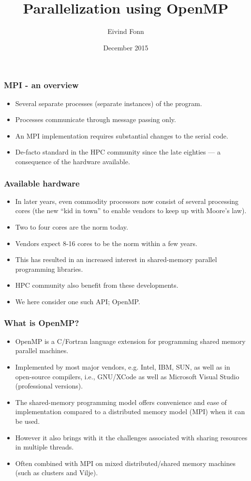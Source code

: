 

\title{Parallelization using OpenMP}
\author{Eivind Fonn}
\date{December 2015}
\maketitle

\begin{frame}
  \frametitle{MPI - an overview}
  \begin{itemize}
  \item Several separate processes (separate instances) of the program.
  \item Processes communicate through message passing only.
  \item An MPI implementation requires substantial changes to the serial code.
  \item De-facto standard in the HPC community since the late eighties --- a
    consequence of the hardware available.
  \end{itemize}
\end{frame}

\begin{frame}
  \frametitle{Available hardware}
  \begin{itemize}
  \item In later years, even commodity processors now consist of several
    processing cores (the new ``kid in town'' to enable vendors to keep up with
    Moore's law).
  \item Two to four cores are the norm today.
  \item Vendors expect 8-16 cores to be the norm within a few years.
  \item This has resulted in an increased interest in shared-memory parallel
    programming libraries.
  \item HPC community also benefit from these developments.
  \item We here consider one such API; OpenMP.
  \end{itemize}
\end{frame}

\begin{frame}
  \frametitle{What is OpenMP?}
  \begin{itemize}
  \item OpenMP is a C/Fortran language extension for programming shared memory
    parallel machines.
  \item Implemented by most major vendors, e.g. Intel, IBM, SUN, as well as in
    open-source compilers, i.e., GNU/XCode as well as Microsoft Visual Studio
    (professional versions).
  \item The shared-memory programming model offers convenience and ease of
    implementation compared to a distributed memory model (MPI) when it can be
    used.
  \item However it also brings with it the challenges associated with sharing
    resources in multiple threads.
  \item Often combined with MPI on mixed distributed/shared memory machines
    (such as clusters and Vilje).
  \end{itemize}
\end{frame}

